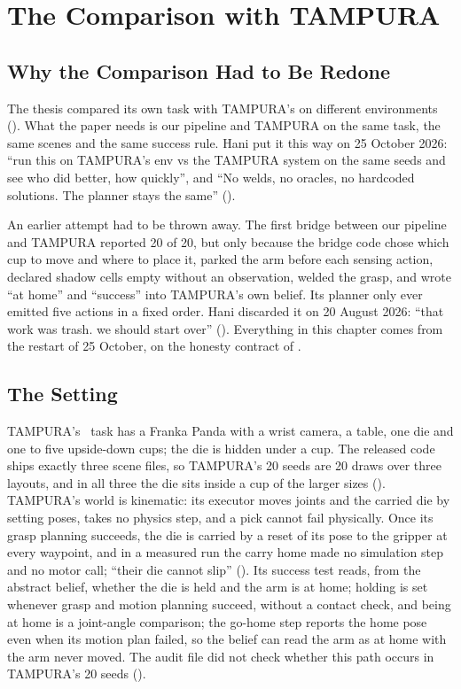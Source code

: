 
\chapter{The Comparison with TAMPURA}
\label{ch:comparison}

\section{Why the Comparison Had to Be Redone}
\label{sec:why-redo}

The thesis compared its own task with TAMPURA's on different environments
(). What the paper needs is our pipeline and TAMPURA on
the same task, the same scenes and the same success rule. Hani put it this way on
25 October 2026: ``run this on TAMPURA's env vs the TAMPURA system on the same
seeds and see who did better, how quickly'', and ``No welds, no oracles, no
hardcoded solutions. The planner stays the same'' ().

An earlier attempt had to be thrown away. The first bridge between our pipeline
and TAMPURA reported 20 of 20, but only because the bridge code chose which cup to
move and where to place it, parked the arm before each sensing action, declared
shadow cells empty without an observation, welded the grasp, and wrote ``at home''
and ``success'' into TAMPURA's own belief. Its planner only ever emitted five
actions in a fixed order. Hani discarded it on 20 August 2026: ``that work was
trash. we should start over'' (). Everything in this chapter comes from the
restart of 25 October, on the honesty contract of .

\section{The Setting}
\label{sec:setting}

TAMPURA's \fdice\ task has a Franka Panda with a wrist camera, a table, one die and one
to five upside-down cups; the die is hidden under a cup. The released code ships exactly three scene
files, so TAMPURA's 20 seeds are 20 draws over three layouts, and in all three
the die sits inside a cup of the larger sizes (). TAMPURA's world is
kinematic: its executor moves joints and the carried die by setting poses, takes no
physics step, and a pick cannot fail physically. Once its grasp planning succeeds, the die is
carried by a reset of its pose to the gripper at every waypoint, and in a measured
run the carry home made no simulation step and no motor call; ``their die cannot
slip'' (). Its success test reads, from the
abstract belief, whether the die is held and the arm is at home; holding is set
whenever grasp and motion planning succeed, without a contact check, and being at
home is a joint-angle comparison; the go-home step reports the home pose even when
its motion plan failed, so the belief can read the arm as at home with the arm never
moved. The audit file did not check whether
this path occurs in TAMPURA's 20 seeds ().

